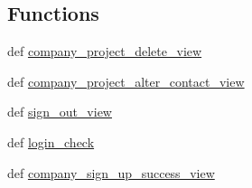 \subsection*{Functions}
\begin{DoxyCompactItemize}
\item 
def \hyperlink{namespacecompanies_1_1views_a079369d6644121702c6a27c534cdeaf3}{company\-\_\-project\-\_\-delete\-\_\-view}
\item 
def \hyperlink{namespacecompanies_1_1views_ad06889a45490a626f5e387c008542703}{company\-\_\-project\-\_\-alter\-\_\-contact\-\_\-view}
\item 
def \hyperlink{namespacecompanies_1_1views_a58082e777f835ce0f8abbf387e68254e}{sign\-\_\-out\-\_\-view}
\item 
def \hyperlink{namespacecompanies_1_1views_a91165520c63b101d4fe4dfed2334c686}{login\-\_\-check}
\item 
def \hyperlink{namespacecompanies_1_1views_a0fe1ec1e299fe4ef66f44112e28ec0dd}{company\-\_\-sign\-\_\-up\-\_\-success\-\_\-view}
\end{DoxyCompactItemize}


